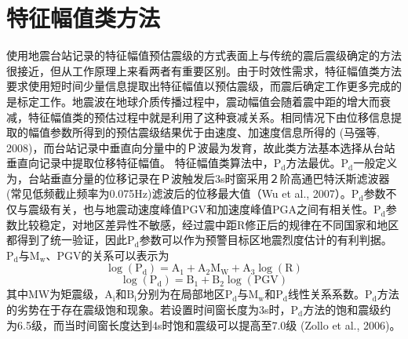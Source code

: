 \section{特征幅值类方法}

 \indent 使用地震台站记录的特征幅值预估震级的方式表面上与传统的震后震级确定的方法很接近，但从工作原理上来看两者有重要区别。由于时效性需求，特征幅值类方法要求使用短时间少量信息提取出特征幅值以预估震级，而震后确定工作更多完成的是标定工作。地震波在地球介质传播过程中，震动幅值会随着震中距的增大而衰减，特征幅值类的预估过程中就是利用了这种衰减关系。相同情况下由位移信息提取的幅值参数所得到的预估震级结果优于由速度、加速度信息所得的 (马强等, 2008)，而台站记录中垂直向分量中的Ｐ波最为发育，故此类方法基本选择从台站垂直向记录中提取位移特征幅值。
 \indent 特征幅值类算法中，$\mathrm{P}_{\mathrm{d}}$方法最优。$\mathrm{P}_{\mathrm{d}}$一般定义为，台站垂直分量的位移记录在Ｐ波触发后3s时窗采用２阶高通巴特沃斯滤波器(常见低频截止频率为0.075Hz)滤波后的位移最大值（Wu et al., 2007）。$\mathrm{P}_{\mathrm{d}}$参数不仅与震级有关，也与地震动速度峰值PGV和加速度峰值PGA之间有相关性。$\mathrm{P}_{\mathrm{d}}$参数比较稳定，对地区差异性不敏感，经过震中距R修正后的规律在不同国家和地区都得到了统一验证，因此$\mathrm{P}_{\mathrm{d}}$参数可以作为预警目标区地震烈度估计的有利判据。$\mathrm{P}_{\mathrm{d}}$与$\mathrm{M}_{\mathrm{w}}$、PGV的关系可以表示为\\
\begin{equation}
\log \left(\mathrm{P}_{\mathrm{d}}\right)=\mathrm{A}_{1}+\mathrm{A}_{2} \mathrm{M}_{\mathrm{W}}+\mathrm{A}_{3} \log (\mathrm{R})
\end{equation}
\begin{equation}
\log \left(\mathrm{P}_{\mathrm{d}}\right)=\mathrm{B}_{1}+\mathrm{B}_{2} \log (\mathrm{PGV})
\end{equation}
 其中MW为矩震级，$\mathrm{A}_{\mathrm{i}}$和$\mathrm{B}_{\mathrm{i}}$分别为在局部地区$\mathrm{P}_{\mathrm{d}}$与$\mathrm{M}_{\mathrm{w}}$和$\mathrm{P}_{\mathrm{d}}$线性关系系数。$\mathrm{P}_{\mathrm{d}}$方法的劣势在于存在震级饱和现象。若设置时间窗长度为3s时，$\mathrm{P}_{\mathrm{d}}$方法的饱和震级约为6.5级，而当时间窗长度达到4s时饱和震级可以提高至7.0级 (Zollo et al., 2006)。\\
 

 
 